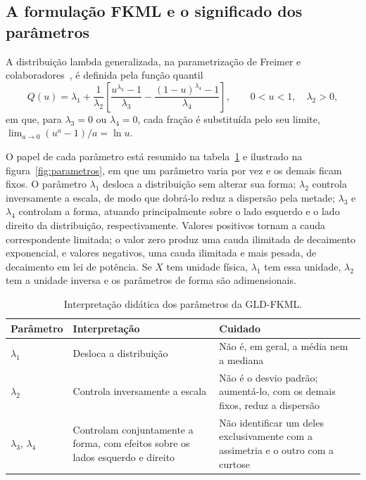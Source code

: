 

\subsection{A formulação FKML e o significado dos parâmetros}

A distribuição lambda generalizada, na parametrização de Freimer e colaboradores~\cite{freimer1988}, é definida pela função quantil
\begin{equation}
    Q(u) = \lambda_1 + \frac{1}{\lambda_2}
    \left[\frac{u^{\lambda_3} - 1}{\lambda_3} - \frac{(1-u)^{\lambda_4} - 1}{\lambda_4}\right],
    \qquad 0 < u < 1, \quad \lambda_2 > 0,
    \label{eq:fkml}
\end{equation}
em que, para $\lambda_3 = 0$ ou $\lambda_4 = 0$, cada fração é substituída pelo seu limite, $\lim_{a \to 0} (u^a - 1)/a = \ln u$.

O papel de cada parâmetro está resumido na tabela~\ref{tab:parametros} e ilustrado na figura~\ref{fig:parametros}, em que um parâmetro varia por vez e os demais ficam fixos. O parâmetro $\lambda_1$ desloca a distribuição sem alterar sua forma; $\lambda_2$ controla inversamente a escala, de modo que dobrá-lo reduz a dispersão pela metade; $\lambda_3$ e $\lambda_4$ controlam a forma, atuando principalmente sobre o lado esquerdo e o lado direito da distribuição, respectivamente. Valores positivos tornam a cauda correspondente limitada; o valor zero produz uma cauda ilimitada de decaimento exponencial, e valores negativos, uma cauda ilimitada e mais pesada, de decaimento em lei de potência. Se $X$ tem unidade física, $\lambda_1$ tem essa unidade, $\lambda_2$ tem a unidade inversa e os parâmetros de forma são adimensionais.

\begin{table}[htbp]
\centering
\caption{Interpretação didática dos parâmetros da GLD-FKML.}
\label{tab:parametros}
\small
\begin{tabular}{p{1.8cm} p{5.6cm} p{6.6cm}}
\toprule
\textbf{Parâmetro} & \textbf{Interpretação} & \textbf{Cuidado} \\
\midrule
$\lambda_1$ & Desloca a distribuição & Não é, em geral, a média nem a mediana \\
$\lambda_2$ & Controla inversamente a escala & Não é o desvio padrão; aumentá-lo, com os demais fixos, reduz a dispersão \\
$\lambda_3$, $\lambda_4$ & Controlam conjuntamente a forma, com efeitos sobre os lados esquerdo e direito & Não identificar um deles exclusivamente com a assimetria e o outro com a curtose \\
\bottomrule
\end{tabular}
\end{table}

